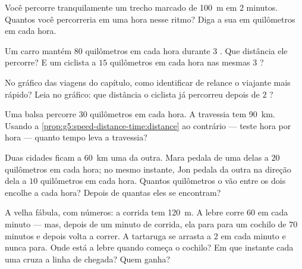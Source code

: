 \begin{exercise}[$\star$]\label{exo:g5:speed-distance-time:6}
Você percorre tranquilamente um trecho marcado de \qty{100}{m} em $2$
minutos. Quantos  você percorreria em uma hora nesse ritmo?
Diga a sua  em quilômetros em cada hora.
\end{exercise}

\begin{exercise}[$\star$]\label{exo:g5:speed-distance-time:7}
Um carro mantém $80$ quilômetros em cada hora durante $3$ . Que
distância ele percorre? E um ciclista a $15$ quilômetros em cada hora
nas mesmas $3$ ?
\end{exercise}

\begin{exercise}[$\star$]\label{exo:g5:speed-distance-time:8}
No gráfico das viagens do capítulo, como identificar de relance o
viajante mais rápido? Leia no gráfico: que distância o ciclista já
percorreu depois de $2$ ?
\end{exercise}

\begin{exercise}[$\star\star$]\label{exo:g5:speed-distance-time:9}
Uma balsa percorre $30$ quilômetros em cada hora. A travessia tem
\qty{90}{km}. Usando a
\cref{prop:g5:speed-distance-time:distance} ao contrário --- teste
hora por hora --- quanto tempo leva a travessia?
\end{exercise}

\begin{exercise}[$\star\star$]\label{exo:g5:speed-distance-time:10}
Duas cidades ficam a \qty{60}{km} uma da outra. Mara pedala de uma
delas a $20$ quilômetros em cada hora; no mesmo instante, Jon pedala
da outra na direção dela a $10$ quilômetros em cada hora. Quantos
quilômetros o vão entre os dois encolhe a cada hora? Depois de
quantas  eles se encontram?
\end{exercise}

\begin{exercise}[$\star\star$]\label{exo:g5:speed-distance-time:11}
A velha fábula, com números: a corrida tem \qty{120}{m}. A lebre
corre $60$  em cada minuto --- mas, depois de um minuto de
corrida, ela para para um cochilo de $70$ minutos e depois volta a
correr. A tartaruga se arrasta a $2$  em cada minuto e nunca
para. Onde está a lebre quando começa o cochilo? Em que instante cada
uma cruza a linha de chegada? Quem ganha?
\end{exercise}
